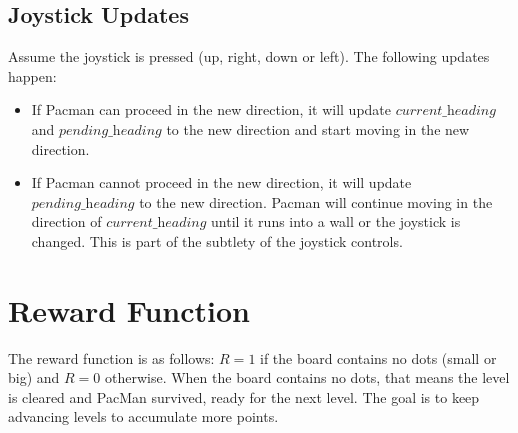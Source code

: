 \documentclass[paper=a4, fontsize=11pt]{scrartcl}
\begin{document}
\subsection{Joystick Updates}

Assume the joystick is pressed (up, right, down or left). The following updates happen:

\begin{itemize}
\item If Pacman can proceed in the new direction, it will update $\textit{current\_heading}$ and $\textit{pending\_heading}$ to the new direction and start moving in the new direction.

\item If Pacman cannot proceed in the new direction, it will update $\textit{pending\_heading}$ to the new direction. Pacman will continue moving in the direction of $\textit{current\_heading}$ until it runs into a wall or the joystick is changed. This is part of the subtlety of the joystick controls.
\end{itemize}

\section{Reward Function}

The reward function is as follows: $R=1$ if the board contains no dots (small or big) and $R=0$ otherwise. When the board contains no dots, that means the level is cleared and PacMan survived, ready for the next level. The goal is to keep advancing levels to accumulate more points.

\end{document}
